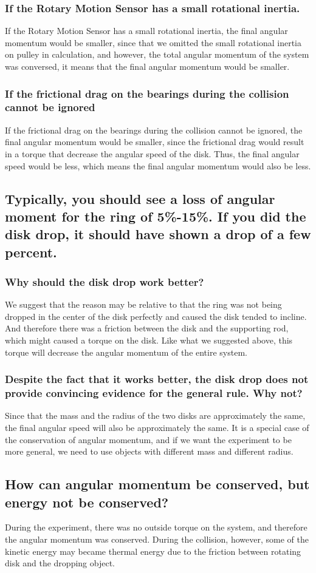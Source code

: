 \documentclass[12pt]{article}
\begin{document}
	\subsubsection{If the Rotary Motion Sensor has a small rotational inertia.}
	If the Rotary Motion Sensor has a small rotational inertia, the final angular momentum would be smaller, since that we omitted the small rotational inertia on pulley in calculation, and however, the total angular momentum of the system was conversed, it means that the final angular momentum would be smaller.
	\subsubsection{If the frictional drag on the bearings during the collision cannot be ignored}
	If the frictional drag on the bearings during the collision cannot be ignored, the final angular momentum would be smaller, since the frictional drag would result in a torque that decrease the angular speed of the disk. Thus, the final angular speed would be less, which means the final angular momentum would also be less. 
	\subsection{Typically, you should see a loss of angular moment for the ring of 5\%-15\%. If you did the disk drop, it should have shown a drop of a few percent.}
	\subsubsection{Why should the disk drop work better?}
	We suggest that the reason may be relative to that the ring was not being dropped in the center of the disk perfectly and caused the disk tended to incline. And therefore there was a friction between the disk and the supporting rod, which might caused a torque on the disk. Like what we suggested above, this torque will decrease the angular momentum of the entire system.
	\subsubsection{Despite the fact that it works better, the disk drop does not provide convincing evidence for the general rule. Why not?}
	Since that the mass and the radius of the two disks are approximately the same, the final angular speed will also be approximately the same. It is a special case of the conservation of angular momentum, and if we want the experiment to be more general, we need to use objects with different mass and different radius.
	\subsection{How can angular momentum be conserved, but energy not be conserved?}
	During the experiment, there was no outside torque on the system, and therefore the angular momentum was conserved. During the collision, however, some of the kinetic energy may became thermal energy due to the friction between rotating disk and the dropping object.
\end{document}
